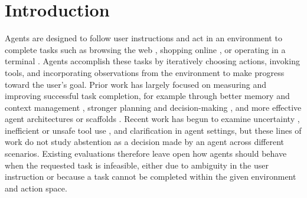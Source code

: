 \documentclass{article}
\begin{document}
\vspace{-3mm}
\section{Introduction}
\vspace{-2mm}
Agents are designed to follow user instructions and act in an environment to complete tasks such as browsing the web \cite{deng2023mind2web}, shopping online \cite{yao2022webshop, guo2026susbench}, or operating in a terminal \cite{merrill2026terminal}. Agents accomplish these tasks by iteratively choosing actions, invoking tools, and incorporating observations from the environment to make progress toward the user’s goal. Prior work has largely focused on measuring and improving successful task completion, for example through better memory and context management \cite{packer2024memgptllmsoperatingsystems}, stronger planning and decision-making \cite{yao2022react}, and more effective agent architectures or scaffolds \cite{wang2023voyager}. Recent work has begun to examine uncertainty \cite{oh2026uncertainty, kirchhof2025position}, inefficient or unsafe tool use \cite{qian2025smart, xie2026oversearchingsearchaugmentedlargelanguage, bonagiri2025check}, and clarification \cite{zhang2025clarify, zhang2024clamber, kobalczyk2025active,cao2026clarify} in agent settings, but these lines of work do not study abstention as a decision made by an agent across different scenarios. 
Existing evaluations therefore leave open how agents should behave when the requested task is infeasible, either due to ambiguity in the user instruction or because a task cannot be completed within the given environment and action space. 


\end{document}
